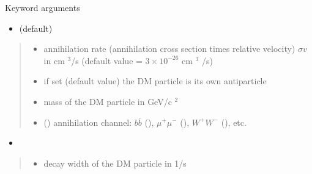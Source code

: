 \documentclass[letterpaper,10pt,english]{sphinxmanual}
\begin{document}
\begin{fulllineitems}
\begin{quote}
\begin{description}
\end{description}\end{quote}

\sphinxAtStartPar
Keyword arguments
\begin{itemize}
\item {} 
\sphinxAtStartPar
{}    (default)

\end{itemize}
\begin{quote}\begin{description}
\begin{itemize}
\item {} 
\sphinxAtStartPar
{} \textendash{} annihilation rate (annihilation cross section times relative velocity) \(\sigma v\) in cm \({}^3\)/s (default value = \(3 \times 10^{-26}\) cm \({}^3\) /s)

\item {} 
\sphinxAtStartPar
{} \textendash{} if set  (default value) the DM particle is its own antiparticle

\item {} 
\sphinxAtStartPar
{} \textendash{} mass of the DM particle in GeV/c \({}^2\)

\item {} 
\sphinxAtStartPar
{} () \textendash{} annihilation channel: \(b\bar b\) (), \(\mu^+ \mu^-\) (), \(W^+ W^-\) (), etc.

\end{itemize}

\end{description}\end{quote}
\begin{itemize}
\item {} 
\sphinxAtStartPar
{}

\end{itemize}
\begin{quote}\begin{description}
\begin{itemize}
\item {} 
\sphinxAtStartPar
{} \textendash{} decay width of the DM particle in 1/s


\end{itemize}
\end{description}
\end{quote}
\end{fulllineitems}
\end{document}
